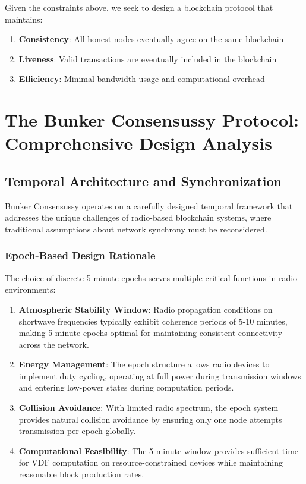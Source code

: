 \documentclass[11pt,a4paper]{article}
\begin{document}
Given the constraints above, we seek to design a blockchain protocol that maintains:

\begin{enumerate}
\item \textbf{Consistency}: All honest nodes eventually agree on the same blockchain
\item \textbf{Liveness}: Valid transactions are eventually included in the blockchain
\item \textbf{Efficiency}: Minimal bandwidth usage and computational overhead
\end{enumerate}

\section{The Bunker Consensussy Protocol: Comprehensive Design Analysis}

\subsection{Temporal Architecture and Synchronization}

Bunker Consensussy operates on a carefully designed temporal framework that addresses the unique challenges of radio-based blockchain systems, where traditional assumptions about network synchrony must be reconsidered.

\subsubsection{Epoch-Based Design Rationale}

The choice of discrete 5-minute epochs serves multiple critical functions in radio environments:

\begin{enumerate}
\item \textbf{Atmospheric Stability Window}: Radio propagation conditions on shortwave frequencies typically exhibit coherence periods of 5-10 minutes, making 5-minute epochs optimal for maintaining consistent connectivity across the network.

\item \textbf{Energy Management}: The epoch structure allows radio devices to implement duty cycling, operating at full power during transmission windows and entering low-power states during computation periods.

\item \textbf{Collision Avoidance}: With limited radio spectrum, the epoch system provides natural collision avoidance by ensuring only one node attempts transmission per epoch globally.

\item \textbf{Computational Feasibility}: The 5-minute window provides sufficient time for VDF computation on resource-constrained devices while maintaining reasonable block production rates.
\end{enumerate}
\end{document}
